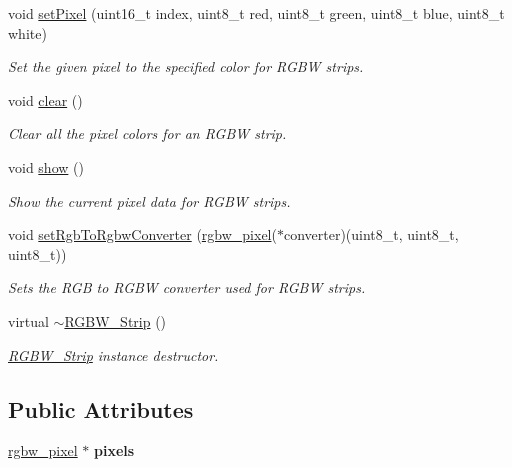 \begin{DoxyCompactItemize}
void \mbox{\hyperlink{classRGBW__Strip_a9eb7315c6558239653198503a892afc2}{set\+Pixel}} (uint16\+\_\+t index, uint8\+\_\+t red, uint8\+\_\+t green, uint8\+\_\+t blue, uint8\+\_\+t white)
\begin{DoxyCompactList}\small\item\em Set the given pixel to the specified color for R\+G\+BW strips. \end{DoxyCompactList}\item 
void \mbox{\hyperlink{classRGBW__Strip_ac429a3d07c38e87c91e35b7fbb5cc32c}{clear}} ()
\begin{DoxyCompactList}\small\item\em Clear all the pixel colors for an R\+G\+BW strip. \end{DoxyCompactList}\item 
void \mbox{\hyperlink{classRGBW__Strip_a6951fd2265c832e98c9f02b5d3fb4af6}{show}} ()
\begin{DoxyCompactList}\small\item\em Show the current pixel data for R\+G\+BW strips. \end{DoxyCompactList}\item 
void \mbox{\hyperlink{classRGBW__Strip_a37960460a546a371802dc728d10d8ee0}{set\+Rgb\+To\+Rgbw\+Converter}} (\mbox{\hyperlink{structrgbw__pixel}{rgbw\+\_\+pixel}}($\ast$converter)(uint8\+\_\+t, uint8\+\_\+t, uint8\+\_\+t))
\begin{DoxyCompactList}\small\item\em Sets the R\+GB to R\+G\+BW converter used for R\+G\+BW strips. \end{DoxyCompactList}\item 
\mbox{\label{classRGBW__Strip_a59492df01f428786f6be940d806da9f4}} 
virtual \mbox{\hyperlink{classRGBW__Strip_a59492df01f428786f6be940d806da9f4}{$\sim$\+R\+G\+B\+W\+\_\+\+Strip}} ()
\begin{DoxyCompactList}\small\item\em \mbox{\hyperlink{classRGBW__Strip}{R\+G\+B\+W\+\_\+\+Strip}} instance destructor. \end{DoxyCompactList}\end{DoxyCompactItemize}
\subsection*{Public Attributes}
\begin{DoxyCompactItemize}
\item 
\mbox{\label{classRGBW__Strip_a16a02f2b6b2484e3c4c56f40715523a7}} 
\mbox{\hyperlink{structrgbw__pixel}{rgbw\+\_\+pixel}} $\ast$ {\bfseries pixels}
\end{DoxyCompactItemize}
